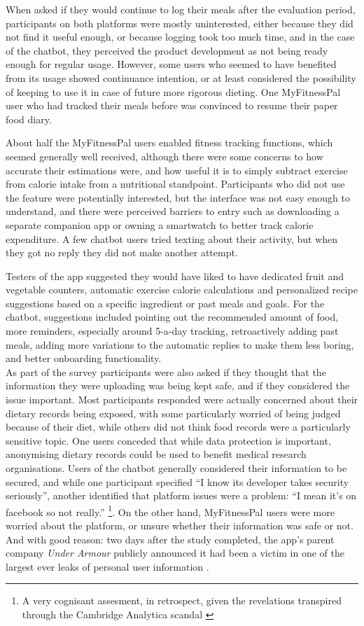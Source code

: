 When asked if they would continue to log their meals after the evaluation period, participants on both platforms were mostly uninterested, either because they did not find it useful enough, or because logging took too much time, and in the case of the chatbot, they perceived the product development as not being ready enough for regular usage. However, some users who seemed to have benefited from its usage showed continuance intention, or at least considered the possibility of keeping to use it in case of future more rigorous dieting. One MyFitnessPal user who had tracked their meals before was convinced to resume their paper food diary. 

About half the MyFitnessPal users enabled fitness tracking functions, which seemed generally well received, although there were some concerns to how accurate their estimations were, and how useful it is to simply subtract exercise from calorie intake from a nutritional standpoint. Participants who did not use the feature were potentially interested, but the interface was not easy enough to understand, and there were perceived barriers to entry such as downloading a separate companion app or owning a smartwatch to better track calorie expenditure. A few chatbot users tried texting about their activity, but when they got no reply they did not make another attempt.

Testers of the app suggested they would have liked to have dedicated fruit and vegetable counters, automatic exercise calorie calculations and personalized recipe suggestions based on a specific ingredient or past meals and goals. For the chatbot, suggestions included pointing out the recommended amount of food, more reminders, especially around 5-a-day tracking, retroactively adding past meals, adding more variations to the automatic replies to make them less boring, and better onboarding functionality. \\
As part of the survey participants were  also asked if they thought that the information they were uploading was being kept safe, and if they considered the issue important. Most participants responded were actually concerned about their dietary records being exposed, with some particularly worried of being judged because of their diet, while others did not think food records were a particularly sensitive topic. One users conceded that while data protection is important, anonymising dietary records could be used to benefit medical research organisations. Users of the chatbot generally considered their information to be secured, and while one participant specified ``I know its developer takes security seriously'', another identified that platform issues were a problem: ``I mean it's on facebook so not really.'' \footnote{A very cognisant assesment, in retrospect, given the revelations transpired through the Cambridge Analytica scandal \cite{cambridgeanalytica}}. On the other hand, MyFitnessPal users were more worried about the platform, or unsure whether their information was safe or not. And with good reason: two days after the study completed, the app's parent company \textit{Under Armour} publicly announced it had been a victim in one of the largest ever leaks of personal user information \cite{underarmour}.
